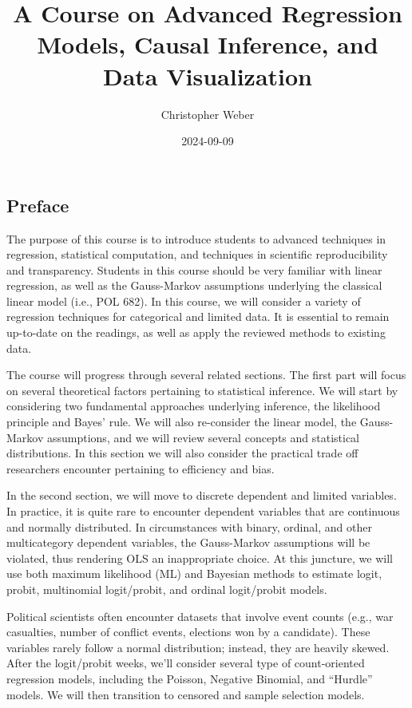 \documentclass[
]{book}
\title{A Course on Advanced Regression Models, Causal Inference, and Data Visualization}
\author{Christopher Weber}
\date{2024-09-09}
\begin{document}
\maketitle

{
\setcounter{tocdepth}{1}
\tableofcontents
}
\chapter*{}\label{section}

\section*{Preface}\label{preface}

The purpose of this course is to introduce students to advanced techniques in regression, statistical computation, and techniques in scientific reproducibility and transparency. Students in this course should be very familiar with linear regression, as well as the Gauss-Markov assumptions underlying the classical linear model (i.e., POL 682). In this course, we will consider a variety of regression techniques for categorical and limited data. It is essential to remain up-to-date on the readings, as well as apply the reviewed methods to existing data.

The course will progress through several related sections. The first part will focus on several theoretical factors pertaining to statistical inference. We will start by considering two fundamental approaches underlying inference, the likelihood principle and Bayes' rule. We will also re-consider the linear model, the Gauss-Markov assumptions, and we will review several concepts and statistical distributions. In this section we will also consider the practical trade off researchers encounter pertaining to efficiency and bias.

In the second section, we will move to discrete dependent and limited variables. In practice, it is quite rare to encounter dependent variables that are continuous and normally distributed. In circumstances with binary, ordinal, and other multicategory dependent variables, the Gauss-Markov assumptions will be violated, thus rendering OLS an inappropriate choice. At this juncture, we will use both maximum likelihood (ML) and Bayesian methods to estimate logit, probit, multinomial logit/probit, and ordinal logit/probit models.

Political scientists often encounter datasets that involve event counts (e.g., war casualties, number of conflict events, elections won by a candidate). These variables rarely follow a normal distribution; instead, they are heavily skewed. After the logit/probit weeks, we'll consider several type of count-oriented regression models, including the Poisson, Negative Binomial, and ``Hurdle'' models. We will then transition to censored and sample selection models.
\end{document}
